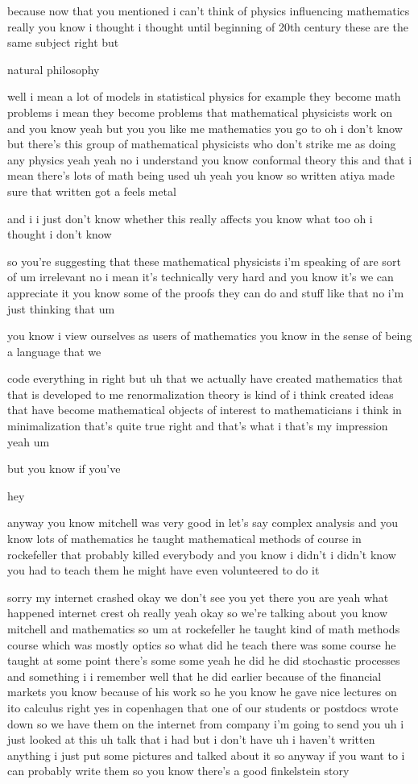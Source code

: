 \begin{description}
because now that you mentioned i can't think of physics influencing mathematics really you know i thought i thought until beginning of 20th century these are the same subject right but

natural philosophy

well i mean a lot of models in statistical physics for example they become math problems i mean they become problems that mathematical physicists work on and you know yeah but you you like me mathematics you go to oh i don't know but there's this group of mathematical physicists who don't strike me as doing any physics yeah yeah no i understand you know conformal theory this and that i mean there's lots of math being used uh yeah you know so written atiya made sure that written got a feels metal

and i i just don't know whether this really affects you know what too oh i thought i don't know

so you're suggesting that these mathematical physicists i'm speaking of are sort of um irrelevant no i mean it's technically very hard and you know it's we can appreciate it you know some of the proofs they can do and stuff like that no i'm just thinking that um

you know i view ourselves as users of mathematics you know in the sense of being a language that we

code everything in right but uh that we actually have created mathematics that that is developed to me renormalization theory is kind of i think created ideas that have become mathematical objects of interest to mathematicians i think in minimalization that's quite true right and that's what i that's my impression yeah um

but you know if you've

hey

anyway you know mitchell was very good in let's say complex analysis and you know lots of mathematics he taught mathematical methods of course in rockefeller that probably killed everybody and you know i didn't i didn't know you had to teach them he might have even volunteered to do it

sorry my internet crashed okay we don't see you yet there you are yeah what happened internet crest oh really yeah okay so we're talking about you know mitchell and mathematics so um at rockefeller he taught kind of math methods course which was mostly optics so what did he teach there was some course he taught at some point there's some some yeah he did he did stochastic processes and something i i remember well that he did earlier because of the financial markets you know because of his work so he you know he gave nice lectures on ito calculus right yes in copenhagen that one of our students or postdocs wrote down so we have them on the internet from company i'm going to send you uh i just looked at this uh talk that i had but i don't have uh i haven't written anything i just put some pictures and talked about it so anyway if you want to i can probably write them so you know there's a good finkelstein story


\end{description}
